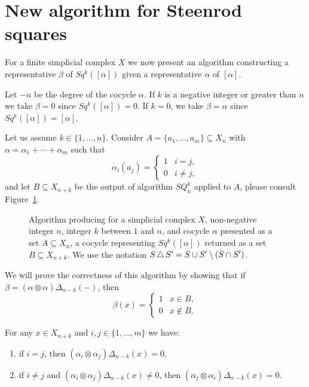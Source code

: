 
\section{New algorithm for Steenrod squares} \label{s:algorithm}

For a finite simplicial complex $X$ we now present an algorithm constructing a representative $\beta$ of $Sq^k([\alpha])$ given a representative $\alpha$ of $[\alpha]$.

Let $-n$ be the degree of the cocycle $\alpha$.
If $k$ is a negative integer or greater than $n$ we take $\beta = 0$ since $Sq^k([\alpha]) = 0$.
If $k = 0$, we take $\beta = \alpha$ since $Sq^k([\alpha]) = [\alpha]$.

Let us assume $k \in \{1, \dots, n\}$.
Consider $A = \{a_1, \dots, a_m\} \subseteq X_n$ with $\alpha = \alpha_1 + \cdots + \alpha_m$ such that
\begin{equation*}
\alpha_i(a_j) = \begin{cases}
1 & i=j, \\ 0 & i\neq j,
\end{cases}
\end{equation*}
and let $B \subseteq X_{n+k}$ be the output of algorithm $SQ_n^k$ applied to $A$, please consult Figure~\cref{f:algorithm}.
\begin{figure}[h]
	
	\caption{Algorithm producing for a simplicial complex $X$, non-negative integer $n$, integer $k$ between $1$ and $n$, and cocycle $\alpha$ presented as a set $A \subseteq X_n$, a cocycle representing $Sq^k([\alpha])$ returned as a set $B \subseteq X_{n+k}$.
	We use the notation $S \operatorname{\triangle} S^\prime = S \cup S^\prime \setminus (S \cap S^\prime)$.}
	\label{f:algorithm}
\end{figure}
We will prove the correctness of this algorithm by showing that if $\beta = (\alpha \otimes \alpha)\Delta_{n-k}(-)$, then
\begin{equation*}
\beta(x) =
\begin{cases}
1 & x \in B, \\
0 & x \not\in B.
\end{cases}
\end{equation*}

\begin{lemma} \label{l:freeness}
	For any $x \in X_{n+k}$ and $i,j \in \{1,\dots,m\}$ we have:
	\begin{enumerate}
		\item if $i=j$, then $(\alpha_i \otimes \alpha_j)\Delta_{n-k}(x) = 0$,
		\item if $i \neq j$ and $(\alpha_i \otimes \alpha_j)\Delta_{n-k}(x) \neq 0$, then $(\alpha_j \otimes \alpha_i)\Delta_{n-k}(x) = 0$.
	\end{enumerate}
\end{lemma}

